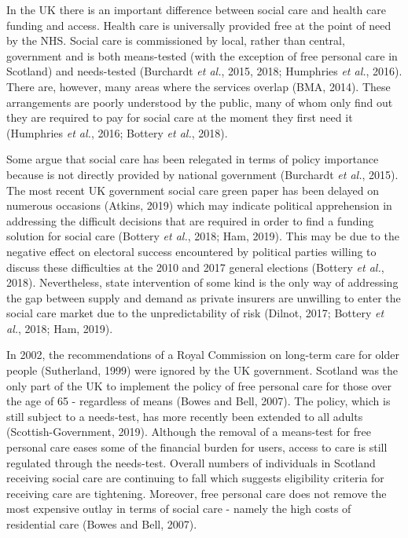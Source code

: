 \documentclass[12pt,a4paper,oneside,table]{report}
\begin{document}
In the UK there is an important difference between social care and
health care funding and access. Health care is universally provided free
at the point of need by the NHS. Social care is commissioned by local,
rather than central, government and is both means-tested (with the
exception of free personal care in Scotland) and needs-tested (Burchardt
\emph{et al.}, 2015, 2018; Humphries \emph{et al.}, 2016). There are,
however, many areas where the services overlap (BMA, 2014). These
arrangements are poorly understood by the public, many of whom only find
out they are required to pay for social care at the moment they first
need it (Humphries \emph{et al.}, 2016; Bottery \emph{et al.}, 2018).

Some argue that social care has been relegated in terms of policy
importance because is not directly provided by national government
(Burchardt \emph{et al.}, 2015). The most recent UK government social
care green paper has been delayed on numerous occasions (Atkins, 2019)
which may indicate political apprehension in addressing the difficult
decisions that are required in order to find a funding solution for
social care (Bottery \emph{et al.}, 2018; Ham, 2019). This may be due to
the negative effect on electoral success encountered by political
parties willing to discuss these difficulties at the 2010 and 2017
general elections (Bottery \emph{et al.}, 2018). Nevertheless, state
intervention of some kind is the only way of addressing the gap between
supply and demand as private insurers are unwilling to enter the social
care market due to the unpredictability of risk (Dilnot, 2017; Bottery
\emph{et al.}, 2018; Ham, 2019).

In 2002, the recommendations of a Royal Commission on long-term care for
older people (Sutherland, 1999) were ignored by the UK government.
Scotland was the only part of the UK to implement the policy of free
personal care for those over the age of 65 - regardless of means (Bowes
and Bell, 2007). The policy, which is still subject to a needs-test, has
more recently been extended to all adults (Scottish-Government, 2019).
Although the removal of a means-test for free personal care eases some
of the financial burden for users, access to care is still regulated
through the needs-test. Overall numbers of individuals in Scotland
receiving social care are continuing to fall which suggests eligibility
criteria for receiving care are tightening. Moreover, free personal care
does not remove the most expensive outlay in terms of social care -
namely the high costs of residential care (Bowes and Bell, 2007).
\end{document}
